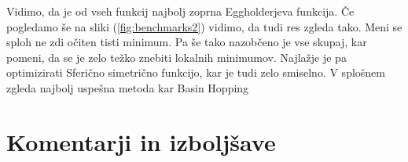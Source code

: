 \documentclass[a4paper]{article}
\begin{document}
Vidimo, da je od vseh funkcij najbolj zoprna Eggholderjeva funkcija. Če pogledamo še na sliki (\ref{fig:benchmarks2})
vidimo, da tudi res zgleda tako. Meni se sploh ne zdi očiten tisti minimum. Pa še tako nazobčeno je vse skupaj, kar 
pomeni, da se je zelo težko znebiti lokalnih minimumov. Najlažje je pa optimizirati Sferično simetrično funkcijo,
kar je tudi zelo smiselno. V splošnem zgleda najbolj uspešna metoda kar Basin Hopping

\section{Komentarji in izboljšave}

\newpage


\end{document}
